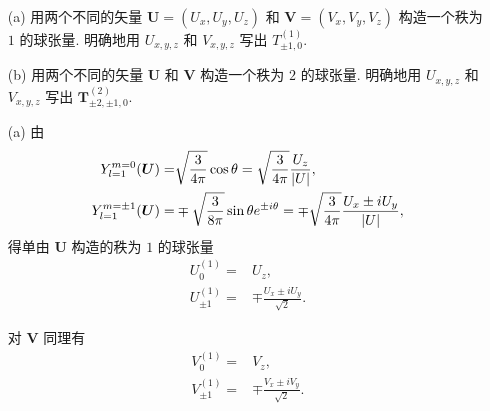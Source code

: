 \documentclass{assignment}
\begin{document}
\begin{prob}[课本习题 3.30]
    \begin{itemize}
        \item[(a)] 用两个不同的矢量 $\bm{U}=(U_x,U_y,U_z)$ 和 $\bm{V}=(V_x,V_y,V_z)$ 构造一个秩为 $1$ 的球张量. 明确地用 $U_{x,y,z}$ 和 $V_{x,y,z}$ 写出 $T_{\pm 1,0}^{(1)}$.
        \item[(b)] 用两个不同的矢量 $\bm{U}$ 和 $\bm{V}$ 构造一个秩为 $2$ 的球张量. 明确地用 $U_{x,y,z}$ 和 $V_{x,y,z}$ 写出 $\bm{T}_{\pm 2,\pm 1,0}^{(2)}$.
    \end{itemize}
\end{prob}
\begin{sol}
    \begin{itemize}
        \item[(a)] 由
        \begin{align}
            Y_{l=1}^{m=0}(\bm{U})=&\sqrt{\frac{3}{4\pi}}\cos\theta=\sqrt{\frac{3}{4\pi}}\frac{U_z}{\left\lvert U\right\rvert},\\
            Y_{l=1}^{m=\pm 1}(\bm{U})=&\mp\sqrt{\frac{3}{8\pi}}\sin\theta e^{\pm i\theta}=\mp\sqrt{\frac{3}{4\pi}}\frac{U_x\pm iU_y}{\left\lvert U\right\rvert},
        \end{align}
        得单由 $\bm{U}$ 构造的秩为 $1$ 的球张量
        \begin{align}
            U_0^{(1)}=&U_z,\\
            U_{\pm 1}^{(1)}=&\mp\frac{U_x\pm iU_y}{\sqrt{2}}.
        \end{align}

        对 $\bm{V}$ 同理有
        \begin{align}
            V_0^{(1)}=&V_z,\\
            V_{\pm 1}^{(1)}=&\mp\frac{V_x\pm iV_y}{\sqrt{2}}.
        \end{align}


\end{itemize}
\end{sol}
\end{document}
